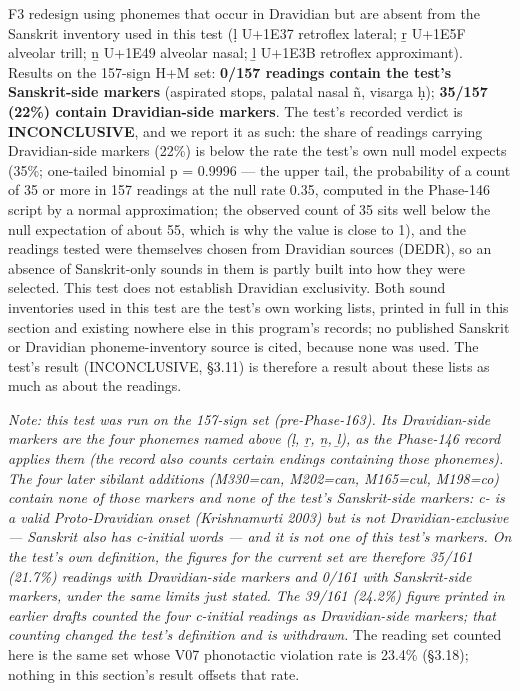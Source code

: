 \documentclass[
]{article}
\newcounter{none} %
\begin{document}
F3 redesign using phonemes that occur in Dravidian but are absent from the Sanskrit inventory used in this test (ḷ U+1E37 retroflex lateral; ṟ U+1E5F alveolar trill; ṉ U+1E49 alveolar nasal; ḻ U+1E3B retroflex approximant). Results on the 157-sign H+M set: \textbf{0/157 readings contain the test's Sanskrit-side markers} (aspirated stops, palatal nasal ñ, visarga ḥ); \textbf{35/157 (22\%) contain Dravidian-side markers}. The test's recorded verdict is \textbf{INCONCLUSIVE}, and we report it as such: the share of readings carrying Dravidian-side markers (22\%) is below the rate the test's own null model expects (35\%; one-tailed binomial p = 0.9996 --- the upper tail, the probability of a count of 35 or more in 157 readings at the null rate 0.35, computed in the Phase-146 script by a normal approximation; the observed count of 35 sits well below the null expectation of about 55, which is why the value is close to 1), and the readings tested were themselves chosen from Dravidian sources (DEDR), so an absence of Sanskrit-only sounds in them is partly built into how they were selected. This test does not establish Dravidian exclusivity. Both sound inventories used in this test are the test's own working lists, printed in full in this section and existing nowhere else in this program's records; no published Sanskrit or Dravidian phoneme-inventory source is cited, because none was used. The test's result (INCONCLUSIVE, §3.11) is therefore a result about these lists as much as about the readings.

\emph{Note: this test was run on the 157-sign set (pre-Phase-163). Its Dravidian-side markers are the four phonemes named above (ḷ, ṟ, ṉ, ḻ), as the Phase-146 record applies them (the record also counts certain endings containing those phonemes). The four later sibilant additions (M330=can, M202=can, M165=cul, M198=co) contain none of those markers and none of the test's Sanskrit-side markers: c- is a valid Proto-Dravidian onset (Krishnamurti 2003) but is not Dravidian-exclusive --- Sanskrit also has c-initial words --- and it is not one of this test's markers. On the test's own definition, the figures for the current set are therefore 35/161 (21.7\%) readings with Dravidian-side markers and 0/161 with Sanskrit-side markers, under the same limits just stated. The 39/161 (24.2\%) figure printed in earlier drafts counted the four c-initial readings as Dravidian-side markers; that counting changed the test's definition and is withdrawn.} The reading set counted here is the same set whose V07 phonotactic violation rate is 23.4\% (§3.18); nothing in this section's result offsets that rate.
\end{document}
